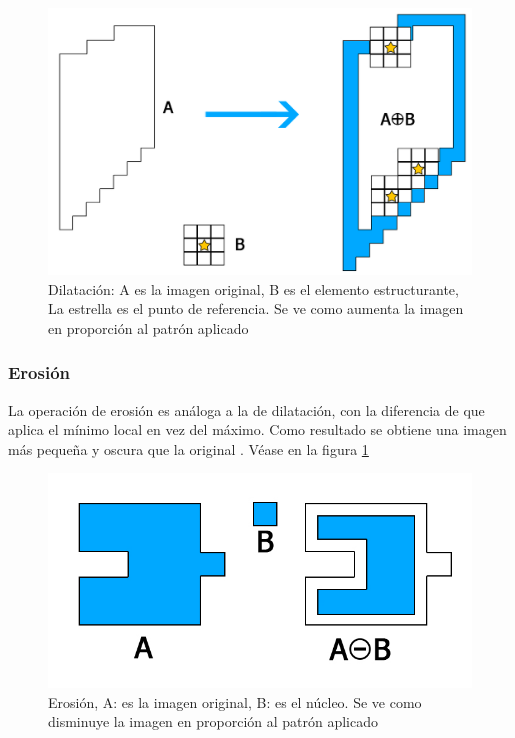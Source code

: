 \begin{figure}[hbtp]

\centering
\includegraphics[scale=0.2]{imagenes/erosion-model.jpg}
\caption{Dilatación: A es la imagen original, B es el elemento estructurante, La estrella es el punto de referencia. Se ve como aumenta la imagen en proporci\'on al patr\'on aplicado }
\end{figure}

\subsubsection{Erosión}

La operación de erosión es análoga a la de dilatación, con la diferencia de que aplica el mínimo local en vez del máximo. Como resultado se obtiene una imagen más pequeña y oscura que la original \cite{BookOpenCv}. V\'ease en la figura \ref{fig:erosion}

\begin{figure}[hbtp]
\centering
\includegraphics[scale=0.3]{imagenes/erosion.jpg}
\caption{Erosión,  A: es la imagen original, B: es el n\'ucleo. Se ve como disminuye la imagen en proporci\'on al patr\'on aplicado}
\label{fig:erosion}
\end{figure}

